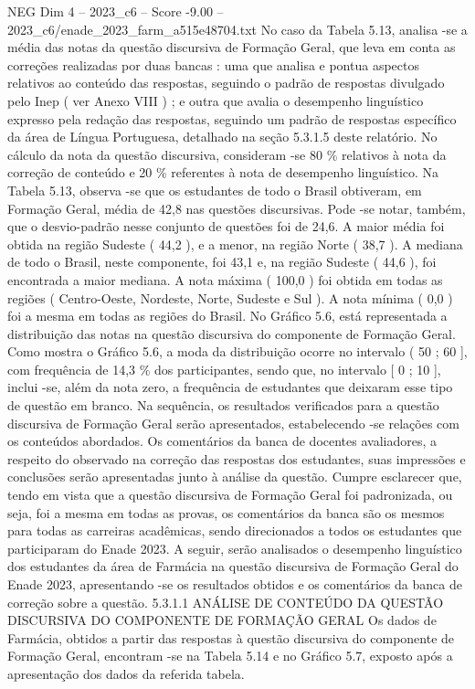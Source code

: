 \begin{textsample}{NEG Dim 4 – 2023\_c6 – Score -9.00 – 2023\_c6/enade\_2023\_farm\_a515e48704.txt}
No caso da Tabela 5.13, analisa -se a média das notas da questão discursiva de Formação Geral, que leva em conta as correções realizadas por duas bancas : uma que analisa e pontua aspectos relativos ao conteúdo das respostas, seguindo o padrão de respostas divulgado pelo Inep ( ver Anexo VIII ) ; e outra que avalia o desempenho linguístico expresso pela redação das respostas, seguindo um padrão de respostas específico da área de Língua Portuguesa, detalhado na seção 5.3.1.5 deste relatório.
No cálculo da nota da questão discursiva, consideram -se 80 \% relativos à nota da correção de conteúdo e 20 \% referentes à nota de desempenho linguístico.
Na Tabela 5.13, observa -se que os estudantes de todo o Brasil obtiveram, em Formação Geral, média de 42,8 nas questões discursivas.
Pode -se notar, também, que o desvio-padrão nesse conjunto de questões foi de 24,6.
A maior média foi obtida na região Sudeste ( 44,2 ), e a menor, na região Norte ( 38,7 ).
A mediana de todo o Brasil, neste componente, foi 43,1 e, na região Sudeste ( 44,6 ), foi encontrada a maior mediana.
A nota máxima ( 100,0 ) foi obtida em todas as regiões ( Centro-Oeste, Nordeste, Norte, Sudeste e Sul ).
A nota mínima ( 0,0 ) foi a mesma em todas as regiões do Brasil.
No Gráfico 5.6, está representada a distribuição das notas na questão discursiva do componente de Formação Geral.
Como mostra o Gráfico 5.6, a moda da distribuição ocorre no intervalo ( 50 ; 60 ], com frequência de 14,3 \% dos participantes, sendo que, no intervalo [ 0 ; 10 ], inclui -se, além da nota zero, a frequência de estudantes que deixaram esse tipo de questão em branco.
Na sequência, os resultados verificados para a questão discursiva de Formação Geral serão apresentados, estabelecendo -se relações com os conteúdos abordados.
Os comentários da banca de docentes avaliadores, a respeito do observado na correção das respostas dos estudantes, suas impressões e conclusões serão apresentadas junto à análise da questão.
Cumpre esclarecer que, tendo em vista que a questão discursiva de Formação Geral foi padronizada, ou seja, foi a mesma em todas as provas, os comentários da banca são os mesmos para todas as carreiras acadêmicas, sendo direcionados a todos os estudantes que participaram do Enade 2023.
A seguir, serão analisados o desempenho linguístico dos estudantes da área de Farmácia na questão discursiva de Formação Geral do Enade 2023, apresentando -se os resultados obtidos e os comentários da banca de correção sobre a questão. 5.3.1.1 ANÁLISE DE CONTEÚDO DA QUESTÃO DISCURSIVA DO COMPONENTE DE FORMAÇÃO GERAL Os dados de Farmácia, obtidos a partir das respostas à questão discursiva do componente de Formação Geral, encontram -se na Tabela 5.14 e no Gráfico 5.7, exposto após a apresentação dos dados da referida tabela.

\end{textsample}

